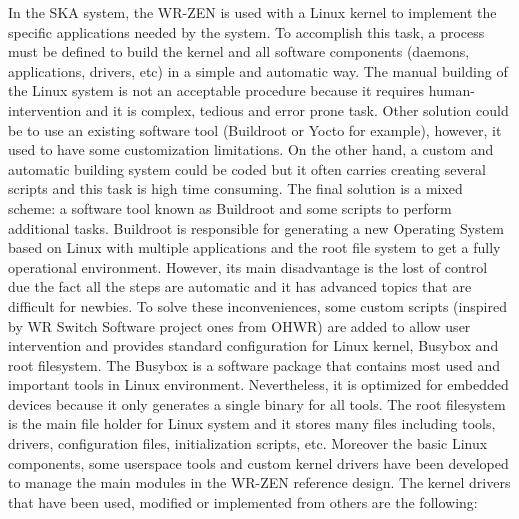 In the SKA system, the WR-ZEN is used with a Linux 
kernel to implement the specific applications needed by the system. To 
accomplish this task, a process must be defined to build the kernel and all 
software components (daemons, applications, drivers, etc) in a simple and 
automatic way. The manual building of the Linux system is not an acceptable 
procedure because it requires human-intervention and it is complex, tedious and 
error prone task. Other solution could be to use an existing software tool 
(Buildroot or Yocto for example), however, it used to have some customization 
limitations. On the other hand, a custom and automatic building system could be 
coded but it often carries creating several scripts and this task is high time 
consuming. The final solution is a mixed scheme: a software tool known as 
Buildroot and some scripts to perform additional tasks. Buildroot is 
responsible for generating a new Operating System based on Linux with multiple 
applications and the root file system to get a fully operational environment. 
However, its main disadvantage is the lost of control due the fact all the 
steps are automatic and it has advanced topics that are difficult for newbies. 
To solve these inconveniences, some custom scripts (inspired by WR Switch 
Software project ones from OHWR) are added to allow user intervention and 
provides standard configuration for Linux kernel, Busybox and root filesystem. 
The Busybox is a software package that contains most used and important tools 
in Linux environment. Nevertheless, it is optimized for embedded devices 
because it only generates a single binary for all tools. The root filesystem is 
the main file holder for Linux system and it stores many files including tools, 
drivers, configuration files, initialization scripts, etc. Moreover the basic 
Linux components, some userspace tools and custom kernel drivers have been 
developed to manage the main modules in the WR-ZEN reference design. The kernel 
drivers that have been used, modified or implemented from others are the 
following:


